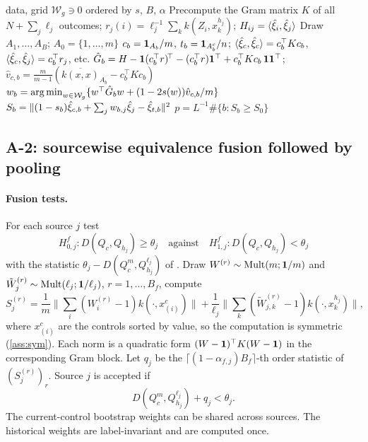 \documentclass[11pt,a4paper]{article}
\begin{document}
\begin{algorithm}[t]
\caption{Risk-weighted borrowing with full reselection (WU-R)}\label{alg:wu}
\begin{algorithmic}[1]
\Require data, grid $\mathcal W_g\ni0$ ordered by $s$, $B$, $\alpha$
\State Precompute the Gram matrix $K$ of all $N+\sum_j\ell_j$ outcomes; $r_j(i)=\ell_j^{-1}\sum_{k}k(Z_i,x^{h_j}_k)$; $H_{ij}=\langle \hat\xi_i, \hat\xi_j\rangle$
\State Draw $A_1,\dots,A_B$; $A_0=\{1,\dots,m\}$
\State $c_b=\mathbf{1}_{A_b}/m$, $t_b=\mathbf{1}_{A_b^c}/n$; $\langle \hat\xi_c, \hat\xi_c\rangle=c_b^\top Kc_b$, $\langle \hat\xi_c, \hat\xi_j\rangle=c_b^\top r_j$, etc.
\State $\hat G_b=H-\mathbf{1} (c_b^\top r)^{\!\top}-(c_b^\top r)\mathbf{1}^\top+c_b^\top Kc_b\,\mathbf{1}\mathbf{1}^\top$;\quad $\hat v_{c,b}=\tfrac{m}{m-1}(\overline{k(x,x)}_{A_b}-c_b^\top Kc_b)$
\State $w_b=\operatorname*{arg\,min}_{w\in\mathcal W_g}\{w^\top\hat G_bw+(1-2s(w))\hat v_{c,b}/m\}$ 
\State $S_b=\lVert (1-s_b)\hat\xi_{c,b}+\sum_jw_{b,j}\hat\xi_j-\hat\xi_{t,b}\rVert^2$ 
\EndFor
\State $p=L^{-1}\#\{b:S_b\ge S_0\}$
\end{algorithmic}
\end{algorithm}

\subsection{A-2: sourcewise equivalence fusion followed by pooling}\label{sec:sourcewise}

\paragraph{Fusion tests.} For each source $j$ test
\[
H^f_{0,j}:D(Q_c,Q_{h_j})\ge\theta_j\quad\text{against}\quad H^f_{1,j}:D(Q_c,Q_{h_j})<\theta_j
\]
with the statistic $\theta_j-D(Q_c^m,Q_{h_j}^{\ell_j})$ of \citet{liugandy2026}. Draw $W^{(r)}\sim\mathrm{Mult}(m;\mathbf{1}/m)$ and $\tilde W^{(r)}_j\sim\mathrm{Mult}(\ell_j;\mathbf{1}/\ell_j)$, $r=1,\dots,B_f$, compute
\[
S^{(r)}_j=\frac1m\Big\|\sum_i(W^{(r)}_i-1)k(\cdot,x^c_{(i)})\Big\|+\frac1{\ell_j}\Big\|\sum_k(\tilde W^{(r)}_{j,k}-1)k(\cdot,x^{h_j}_k)\Big\|,
\]
where $x^c_{(i)}$ are the controls sorted by value, so the computation is symmetric (\cref{ass:sym}). Each norm is a quadratic form $(W-\mathbf{1})^\top K(W-\mathbf{1})$ in the corresponding Gram block. Let $q_j$ be the $\lceil(1-\alpha_{f,j})B_f\rceil$-th order statistic of $(S^{(r)}_j)_r$. Source $j$ is accepted if
\begin{equation}\label{eq:accept}
D(Q_c^m,Q_{h_j}^{\ell_j})+q_j<\theta_j .
\end{equation}
The current-control bootstrap weights can be shared across sources. The historical weights are label-invariant and are computed once.
\end{document}
